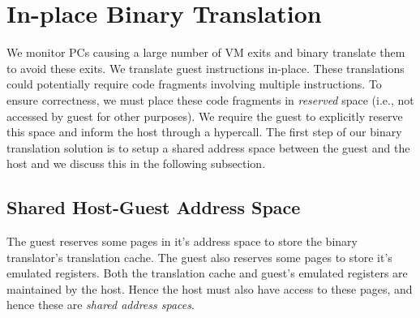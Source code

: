 \documentclass[10pt,twocolumn]{article}
\begin{document}

%

\section{In-place Binary Translation}
\label{sec:bintrans}
We monitor PCs causing a large number of VM exits and binary translate them to
avoid these exits.
We translate guest instructions in-place. These translations could potentially
require code fragments involving multiple instructions. To ensure correctness, we
must place these code fragments in {\em reserved} space (i.e., not accessed by
guest for other purposes). We require the guest to explicitly reserve this space
and inform the host through a hypercall. The first step of our
binary translation solution is to setup a shared address space between
the guest and the host and we discuss this in the following
subsection.
\subsection{Shared Host-Guest Address Space}
\label{sec:sharedspace}
The guest reserves some pages in it's address space to store the
binary translator's translation
cache. The guest also reserves some pages to store it's emulated registers.
Both the translation cache and guest's emulated registers are maintained by
the host. Hence the host must also have access to these pages, and hence these
are {\em shared address spaces}.
\end{document}
